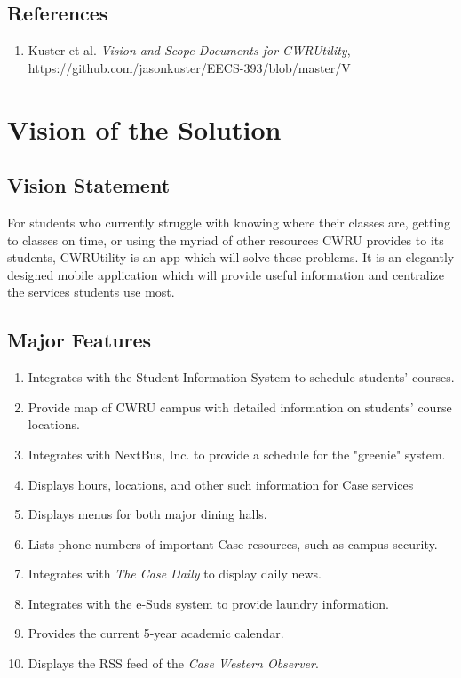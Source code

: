 \documentclass[pdftex,12pt,letter]{article}
\begin{document}
\subsection{References}
\begin{enumerate}[1]
\item Kuster et al. \emph{Vision and Scope Documents for CWRUtility}, https://github.com/jasonkuster/EECS-393/blob/master/V%
\end{enumerate}

\section{Vision of the Solution}
\subsection{Vision Statement}
For students who currently struggle with knowing where their classes are, getting to classes on time, or using the myriad of other resources CWRU provides to its students, CWRUtility is an app which will solve these problems. It is an elegantly designed mobile application which will provide useful information and centralize the services students use most.
\subsection{Major Features}
\begin{enumerate}[FE-1:]
\item Integrates with the Student Information System to schedule students' courses.
\item Provide map of CWRU campus with detailed information on students' course locations.
\item Integrates with NextBus, Inc. to provide a schedule for the "greenie" system.
\item Displays hours, locations, and other  such information for Case services
\item Displays menus for both major dining halls.
\item Lists phone numbers of important Case resources, such as campus security.
\item Integrates with \emph{The Case Daily} to display daily news.
\item Integrates with the e-Suds system to provide laundry information.
\item Provides the current 5-year academic calendar.
\item Displays the RSS feed of the \emph{Case Western Observer}.
\end{enumerate} 
\end{document}
